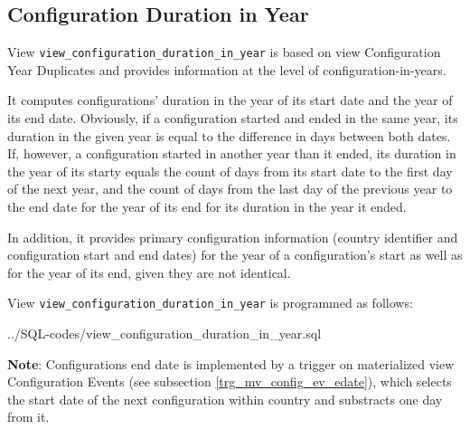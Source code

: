 \subsection{Configuration Duration in Year}\label{view_configuration_duration_in_year}
View \texttt{\footnotesize view\_configuration\_duration\_in\_year} is based on view Configuration Year Duplicates and provides information at the level of configuration-in-years.

It computes configurations' duration in the year of its start date and the year of its end date. 
Obviously, if a configuration started and ended in the same year, its duration in the given year is equal to the difference in days between both dates. 
If, however, a configuration started in another year than it ended, its duration in the year of its starty equals the count of days from its start date to the first day of the next year,
and the count of days from the last day of the previous year to the end date for the year of its end for its duration in the year it ended.

In addition, it provides primary configuration information (country identifier and configuration start and end dates) for the year of a configuration's start as well as for the year of its end, given they are not identical. 

View \texttt{\footnotesize view\_configuration\_duration\_in\_year} is programmed as follows: 

%
{../SQL-codes/view_configuration_duration_in_year.sql}


{\bf Note}: Configurations end date is implemented by a trigger on materialized view Configuration Events (see subsection \ref{trg_mv_config_ev_edate}), which selects the start date of the next configuration within country and substracts one day from it.